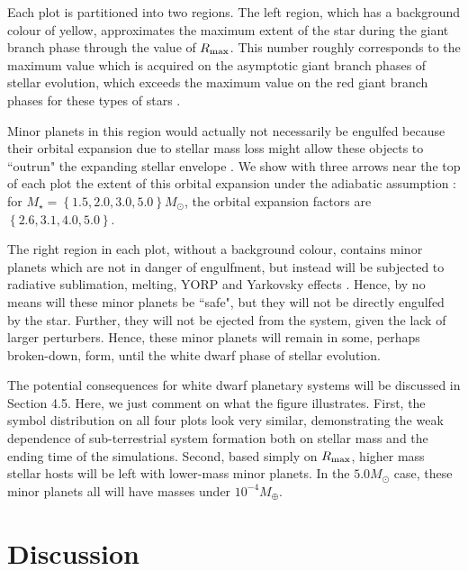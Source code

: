 \documentclass[useAMS,usenatbib]{mn2e}
\newcommand{\rev}{ }
\begin{document}
Each plot is partitioned into two regions. The left region, which has a background colour of yellow, approximates the maximum extent of the star during the giant branch phase through the value of $R_{\rm max}$. This number roughly corresponds to the maximum value which is acquired on the asymptotic giant branch phases of stellar evolution, which exceeds the maximum value on the red giant branch phases for these types of stars \citep{musvil2012,adablo2013}. 

Minor planets in this region would actually not necessarily be engulfed because their orbital expansion due to stellar mass loss might allow these objects to ``outrun" the expanding stellar envelope \citep{hadjidemetriou1963}. We show with three arrows near the top of each plot the extent of this orbital expansion under the adiabatic assumption \citep{veretal2011}: for $M_{\star} = \left\lbrace 1.5, 2.0, 3.0, 5.0 \right\rbrace M_{\odot}$, the orbital expansion factors are $\left\lbrace 2.6, 3.1, 4.0, 5.0 \right\rbrace$.

The right region in each plot, without a background colour, contains minor planets which are not in danger of engulfment, but instead will be subjected to radiative sublimation, melting, YORP and Yarkovsky effects \citep{jurxu2010,juretal2012,veretal2014,veretal2015,veretal2019,versch2020,malper2016,malper2017a,malper2017b,katz2018,lietal2024}. Hence, by no means will these minor planets be ``safe", but they will not be directly engulfed by the star. Further, they will not be ejected from the system, given the lack of larger perturbers. Hence, these minor planets will remain in some, perhaps broken-down, form, until the white dwarf phase of stellar evolution.

The potential consequences for white dwarf planetary systems will be discussed in {\rev Section 4.5}. Here, we just comment on what the figure illustrates. First, the symbol distribution on all four plots look very similar, demonstrating the weak dependence of sub-terrestrial system formation both on stellar mass and the ending time of the simulations. Second, based simply on $R_{\rm max}$, higher mass stellar hosts will be left with lower-mass minor planets. In the $5.0M_{\odot}$ case, these minor planets all will have masses under $10^{-4}M_{\oplus}$.


\section{Discussion}
\end{document}
